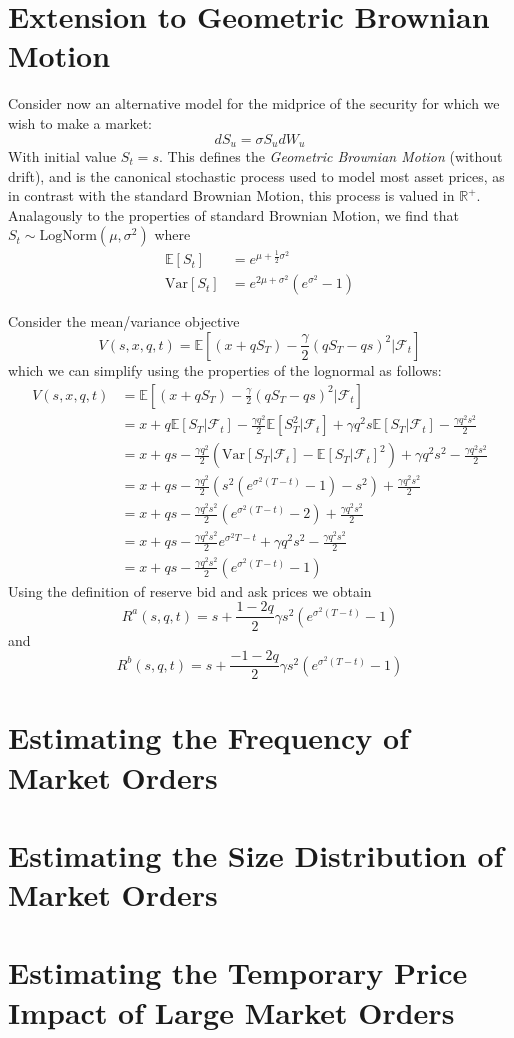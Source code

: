 \section{Extension to Geometric Brownian Motion}
Consider now an alternative model for the midprice of the security for 
which we wish to make a market:
$$dS_u=\sigma S_udW_u$$
With initial value $S_t=s.$ This defines the \textit{Geometric Brownian Motion} (without drift), and
is the canonical stochastic process used to model most asset prices, as in
contrast with the standard Brownian Motion, this process is valued in $\mathbb{R}^+.$
Analagously to the properties of standard Brownian Motion, we find that $S_t\sim\textrm{LogNorm}(\mu,\sigma^2)$
where
\begin{align*}
    \mathbb{E}[S_t]&=e^{\mu+\frac{1}{2}\sigma^2}\\
    \textrm{Var}[S_t]&=e^{2\mu+\sigma^2}(e^{\sigma^2}-1)
\end{align*}

Consider the mean/variance objective
\begin{equation}
    V(s,x,q,t)=\mathbb{E}\left[(x+qS_T)-\frac{\gamma}{2}(qS_T-qs)^2|\mathcal{F}_t\right]
\end{equation}
which we can simplify using the properties of the lognormal as follows:
\begin{align*}
    V(s,x,q,t)&=\mathbb{E}\left[(x+qS_T)-\frac{\gamma}{2}(qS_T-qs)^2|\mathcal{F}_t\right]\\
    &=x+q\mathbb{E}[S_T|\mathcal{F}_t]-\frac{\gamma q^2}{2}\mathbb{E}[S_T^2|\mathcal{F}_t]+\gamma q^2s\mathbb{E}[S_T|\mathcal{F}_t]-\frac{\gamma q^2s^2}{2}\\
    &=x+qs-\frac{\gamma q^2}{2}\left(\textrm{Var}[S_T|\mathcal{F}_t]-\mathbb{E}[S_T|\mathcal{F}_t]^2\right)+\gamma q^2s^2-\frac{\gamma q^2s^2}{2}\\
    &=x+qs-\frac{\gamma q^2}{2}\left(s^2\left(e^{\sigma^2(T-t)}-1\right)-s^2\right)+\frac{\gamma q^2s^2}{2}\\
    &=x+qs-\frac{\gamma q^2s^2}{2}\left(e^{\sigma^2(T-t)}-2\right)+\frac{\gamma q^2s^2}{2}\\
    &=x+qs-\frac{\gamma q^2s^2}{2}e^{\sigma^2{T-t}}+\gamma q^2s^2-\frac{\gamma q^2s^2}{2}\\
    &=x+qs-\frac{\gamma q^2s^2}{2}\left(e^{\sigma^2(T-t)}-1\right)
\end{align*}
Using the definition of reserve bid and ask prices we obtain
\begin{equation}
    R^a(s,q,t)=s+ \frac{1-2q}{2} \gamma s^2 \left(e^{\sigma^2(T-t)}-1\right)
\end{equation}
and
\begin{equation}
    R^b(s,q,t)=s+ \frac{-1-2q}{2} \gamma s^2 \left(e^{\sigma^2(T-t)}-1\right)
\end{equation}
\section{Estimating the Frequency of Market Orders}
\section{Estimating the Size Distribution of Market Orders}
\section{Estimating the Temporary Price Impact of Large Market Orders}